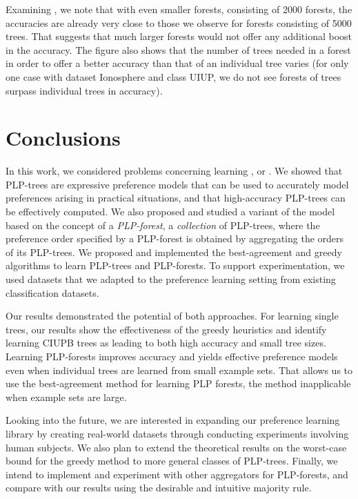 Examining , we note that with even smaller forests, consisting
of 2000 forests, the accuracies are already very close to those we observe 
for forests consisting of 5000 trees. That suggests that much larger forests
would not offer any additional boost in the accuracy.
The figure also shows that the number of trees needed in a forest in order to
offer a better accuracy than that of an individual tree varies (for only 
one case with dataset Ionosphere and class UIUP, we do not see forests 
of trees surpass individual trees in accuracy).

\section{Conclusions}
In this work, we considered problems concerning learning
, or .
We showed that PLP-trees are expressive preference models that can be
used to accurately model preferences arising in practical situations, and
that high-accuracy PLP-trees can be effectively computed. We also proposed
and studied a variant of the model based on the concept of a \emph{PLP-forest},
a \emph{collection} of PLP-trees, where the preference order specified by a
PLP-forest is obtained by aggregating the orders of its PLP-trees.
We proposed and implemented the best-agreement and greedy algorithms
to learn PLP-trees and PLP-forests. To support experimentation, we used
datasets that we adapted to the preference learning setting from existing
classification datasets.

Our results demonstrated the potential of both approaches. For learning 
single trees, our results show the effectiveness of the greedy heuristics 
and identify learning CIUPB trees as leading to both high accuracy and small
tree sizes. Learning PLP-forests improves accuracy and yields effective
preference models even when individual trees are learned from small example
sets. That allows us to use the best-agreement method for learning
PLP forests, the method inapplicable when example sets are large.

Looking into the future, we are interested in expanding our preference
learning library by creating real-world datasets through
conducting experiments involving human subjects.
We also plan to extend the theoretical results on the worst-case
bound for the greedy method to more general classes of PLP-trees.
Finally, we intend to implement and experiment with other aggregators
for PLP-forests, and compare with our results using
the desirable and intuitive majority rule.
